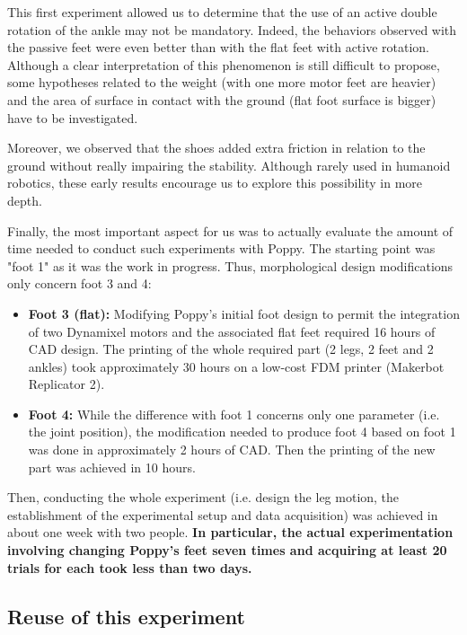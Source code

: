This first experiment allowed us to determine that the use of an active double rotation of the ankle may not be mandatory. Indeed, the behaviors observed with the passive feet were even better than with the flat feet with active rotation. Although a clear interpretation of this phenomenon is still difficult to propose, some hypotheses related to the weight (with one more motor feet are heavier) and the area of surface in contact with the ground (flat foot surface is bigger) have to be investigated.

Moreover, we observed that the shoes added extra friction in relation to the ground without really impairing the stability. Although rarely used in humanoid robotics, these early results encourage us to explore this possibility in more depth.

Finally, the most important aspect for us was to actually evaluate the amount of time needed to conduct such experiments with Poppy. The starting point was "foot 1" as it was the work in progress. Thus, morphological design modifications only concern foot 3 and 4:
\begin{itemize}
    \item \textbf{Foot 3 (flat):} Modifying Poppy’s initial foot design to permit the integration of two Dynamixel motors and the associated flat feet required 16 hours of CAD design. The printing of the whole required part (2 legs, 2 feet and 2 ankles) took approximately 30 hours on a low-cost FDM printer (Makerbot Replicator 2).
    \item \textbf{Foot 4:} While the difference with foot 1 concerns only one parameter (i.e. the joint position), the modification needed to produce foot 4 based on foot 1 was done in approximately 2 hours of CAD. Then the printing of the new part was achieved in 10 hours.
\end{itemize}

Then, conducting the whole experiment (i.e. design the leg motion, the establishment of the experimental setup and data acquisition) was achieved in about one week with two people. \textbf{In particular, the actual experimentation involving changing Poppy's feet seven times and acquiring at least 20 trials for each took less than two days.}

\subsection{Reuse of this experiment} %

